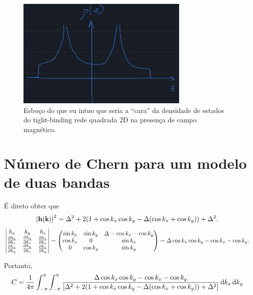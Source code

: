 \documentclass[a4paper,10pt]{article}
\begin{document}
\begin{figure}[H]
\centering
\includegraphics[width=0.75\textwidth]{fig/dos-esboco.png}
\caption{Esboço do que eu intuo que seria a ``cara'' da densidade de estados do tight-binding rede quadrada 2D na presença de campo magnético.}
\label{fig:dos-esboco}
\end{figure}


\pagebreak

\section{Número de Chern para um modelo de duas bandas}

É direto obter que
$$
\abs{\vb{h}(\vb{k})}^2 =
\Delta^2 + 2 (1 + \cos k_x \cos k_y - \Delta (\cos k_x + \cos k_y)) + \Delta^2.
$$
$$
\begin{vmatrix}
h_x & h_y & h_z \\
\pdv{h_x}{k_x} & \pdv{h_y}{k_x} & \pdv{h_z}{k_x} \\
\pdv{h_x}{k_y} & \pdv{h_y}{k_z} & \pdv{h_z}{k_y} \\
\end{vmatrix}
=
\begin{pmatrix}
\sin k_x & \sin k_y & \Delta - \cos k_x - \cos k_y \\
\cos k_x &  0 & \sin k_x \\
0 & \cos k_y & \sin k_y \\
\end{pmatrix}
=
\Delta \cos k_x \cos k_y - \cos k_x - \cos k_y.
$$

Portanto,
$$
C = \frac{1}{4\pi} \int_{-\pi}^{\pi} \int_{-\pi}^{\pi}
\frac{\Delta \cos k_x \cos k_y - \cos k_x - \cos k_y}{\qty[\Delta^2 + 2 (1 + \cos k_x \cos k_y - \Delta (\cos k_x + \cos k_y)) + \Delta^2]}
\dd{k_x} \dd{k_y}
$$
\end{document}
